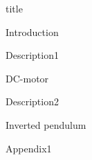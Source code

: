\documentclass{article}
\begin{document}
{title}

\frontmatter

\tableofcontents

\listoffigures

\mainmatter

{Introduction}
\newpage

{Description1}
\newpage

{DC-motor}
\newpage

{Description2}
\newpage

{Inverted pendulum}
\newpage


\addappendix
{Appendix1}

\end{document}
